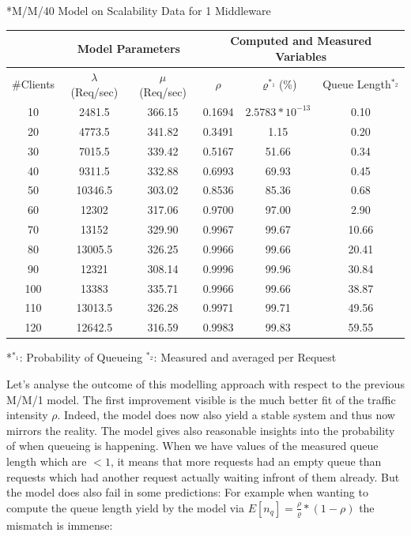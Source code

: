 \documentclass[11pt]{article}
\begin{document}
\begin{center}
	*{M/M/40 Model on Scalability Data for 1 Middleware}
	\begin{tabular}{c|c|c||c|c|c}
		\hline
		& \multicolumn{2}{c||}{Model Parameters} & \multicolumn{3}{c}{Computed and Measured Variables} \\
		\hline
		\#Clients & $\lambda$ (Req/sec) & $\mu$ (Req/sec) & $\rho$ & $\varrho^{*_1}$(\%) & Queue Length$^{*_2}$ \\
		\hline
		10 & 2481.5 & 366.15 & 0.1694 & $2.5783*10^{-13}$ & 0.10\\
		20 & 4773.5 & 341.82 & 0.3491 & 1.15 & 0.20\\
		30 & 7015.5 & 339.42 & 0.5167 & 51.66 & 0.34\\
		40 & 9311.5 & 332.88 & 0.6993 & 69.93 & 0.45\\
		50 & 10346.5 & 303.02 & 0.8536 &85.36 & 0.68\\
		60 & 12302 & 317.06 & 0.9700 & 97.00 & 2.90\\
		70 & 13152 & 329.90 & 0.9967 & 99.67 & 10.66\\
		80 & 13005.5 & 326.25 & 0.9966 & 99.66  & 20.41\\
		90 & 12321 & 308.14 & 0.9996 & 99.96 & 30.84\\
		100 & 13383 & 335.71 & 0.9966 & 99.66 & 38.87\\
		110 & 13013.5 & 326.28 & 0.9971 & 99.71 & 49.56\\
		120 & 12642.5 & 316.59 & 0.9983 & 99.83 & 59.55\\
		\hline		
	\end{tabular}
	*{$^{*_1}$: Probability of Queueing $^{*_2}$: Measured and averaged per Request}
\end{center}

Let's analyse the outcome of this modelling approach with respect to the previous M/M/1 model. The first improvement visible is the much better fit of the traffic intensity $\rho$. Indeed, the model does now also yield a stable system and thus now mirrors the reality. The model gives also reasonable insights into the probability of when queueing is happening. When we have values of the measured queue length which are $<1$, it means that more requests had an empty queue than requests which had another request actually waiting infront of them already. But the model does also fail in some predictions: For example when wanting to compute the queue length yield by the model via $E[n_q]=\frac{\rho}{\varrho}*(1-\rho)$ the mismatch is immense:
\end{document}
